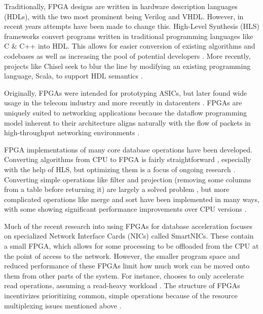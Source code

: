 Traditionally, FPGA designs are written in hardware description languages
(HDLs), with the two most prominent being Verilog and VHDL. However, in recent
years attempts have been made to change this. High-Level Synthesis (HLS)
frameworks convert programs written in traditional programming languages like C
\& C++ into HDL. This allows for easier conversion of existing algorithms and
codebases as well as increasing the pool of potential developers
\autocite{martin-destest-2009}. More recently, projects like Chisel seek to blur
the line by modifying an existing programming language, Scala, to support HDL
semantics \autocite{chisel}.

Originally, FPGAs were intended for prototyping ASICs, but later found wide
usage in the telecom industry \autocite{bobda-trets-2022,mencer-queue-2020} and
more recently in datacenters \autocite{mencer-queue-2020,hoozemans-cas-2021}.
FPGAs are uniquely suited to networking applications because the dataflow
programming model \autocite{hoozemans-cas-2021} inherent to their architecture
aligns naturally with the flow of packets in high-throughput networking
environments \autocite{mueller-sigmod-2009}.


\label{sec:datacenter-fpga}

FPGA implementations of many core database operations have been developed.
Converting algorithms from CPU to FPGA is fairly straightforward
\autocite{fang-vldb-2020}, especially with the help of HLS, but optimizing them
is a focus of ongoing research \autocite{fang-vldb-2020}. Converting simple
operations like filter and projection (removing some columns from a table before
returning it) are largely a solved problem \autocite{fang-vldb-2020}, but more
complicated operations like merge and sort have been implemented in many ways,
with some showing significant performance improvements over CPU versions
\autocite{leggett-trets-2025,moghaddamfar-damon-2021}.

Much of the recent research into using FPGAs for database acceleration focuses
on specialized Network Interface Cards (NICs) called SmartNICs. These contain a
small FPGA, which allows for some processing to be offloaded from the CPU at the
point of access to the network. However, the smaller program space and reduced
performance of these FPGAs limit how much work can be moved onto them from other
parts of the system. For instance,  chooses to only
accelerate read operations, assuming a read-heavy workload \autocite{honeycomb}.
The structure of FPGAs incentivizes prioritizing common, simple operations
because of the resource multiplexing issues mentioned above
\autocite{honeycomb,moghaddamfar-damon-2021}.
